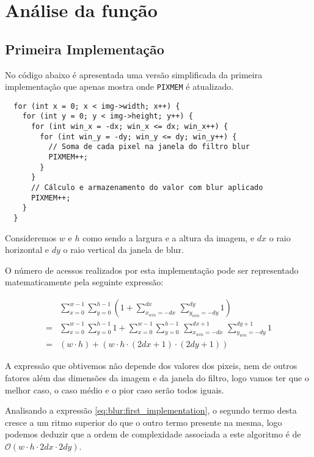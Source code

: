 \chapter{Análise da função }

\section{Primeira Implementação}

No código abaixo é apresentada uma versão simplificada da primeira implementação
que apenas mostra onde \Verb|PIXMEM| é atualizado.

\begin{listing}[H]
	\centering
	\begin{verbatim}
  for (int x = 0; x < img->width; x++) {
    for (int y = 0; y < img->height; y++) {
      for (int win_x = -dx; win_x <= dx; win_x++) {
        for (int win_y = -dy; win_y <= dy; win_y++) {
          // Soma de cada pixel na janela do filtro blur
          PIXMEM++;
        }
      }
      // Cálculo e armazenamento do valor com blur aplicado
      PIXMEM++;
    }
  }
  \end{verbatim}
\end{listing}

Consideremos $w$ e $h$ como sendo a largura e a altura da imagem, e $dx$
o raio horizontal e $dy$ o raio vertical da janela de blur.

O número de acessos realizados por esta implementação pode ser representado
matematicamente pela seguinte expressão:

\begin{align}
	  & \sum_{x = 0}^{w - 1} \sum_{y = 0}^{h - 1} \left(
	1 +
	\sum_{x_{win} = -dx}^{dx} \,
	\sum_{y_{win} = -dy}^{dy} 1
	\right)                                                          \\
	= & \sum_{x = 0}^{w - 1} \sum_{y = 0}^{h - 1} 1 +
	\sum_{x = 0}^{w - 1} \sum_{y = 0}^{h - 1} \,
	\sum_{x_{win} = -dx}^{dx + 1} \, \sum_{y_{win} = -dy}^{dy + 1} 1 \\
	= & (w \cdot h) + (w \cdot h \cdot (2dx + 1) \cdot (2dy + 1))
	\label{eq:blur:first_implementation}
\end{align}

A expressão que obtivemos não depende dos valores dos pixeis, nem de outros
fatores além das dimensões da imagem e da janela do filtro, logo vamos ter que o
melhor caso, o caso médio e o pior caso serão todos iguais.

Analisando a expressão \eqref{eq:blur:first_implementation}, o segundo termo
desta cresce a um ritmo superior do que o outro termo presente na mesma, logo
podemos deduzir que a ordem de complexidade associada a este algoritmo é de
$\mathcal{O}(w \cdot h \cdot 2dx \cdot 2dy)$.

